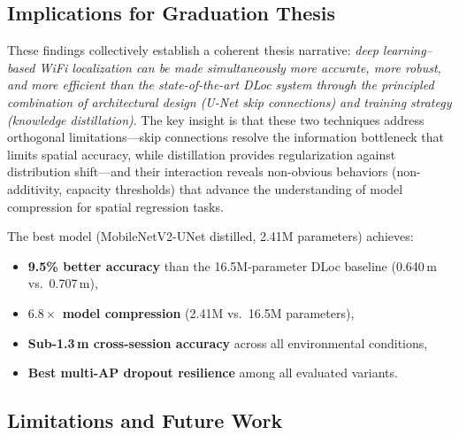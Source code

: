 \documentclass[11pt,a4paper]{article}
\begin{document}
\subsection{Implications for Graduation Thesis}

These findings collectively establish a coherent thesis narrative: \emph{deep learning--based WiFi localization can be made simultaneously more accurate, more robust, and more efficient than the state-of-the-art DLoc system through the principled combination of architectural design (U-Net skip connections) and training strategy (knowledge distillation)}.
The key insight is that these two techniques address orthogonal limitations---skip connections resolve the information bottleneck that limits spatial accuracy, while distillation provides regularization against distribution shift---and their interaction reveals non-obvious behaviors (non-additivity, capacity thresholds) that advance the understanding of model compression for spatial regression tasks.

The best model (MobileNetV2-UNet distilled, 2.41M parameters) achieves:
\begin{itemize}[nosep]
  \item \textbf{9.5\% better accuracy} than the 16.5M-parameter DLoc baseline (0.640\,m vs.\ 0.707\,m),
  \item \textbf{$6.8\times$ model compression} (2.41M vs.\ 16.5M parameters),
  \item \textbf{Sub-1.3\,m cross-session accuracy} across all environmental conditions,
  \item \textbf{Best multi-AP dropout resilience} among all evaluated variants.
\end{itemize}

\subsection{Limitations and Future Work}
\end{document}
